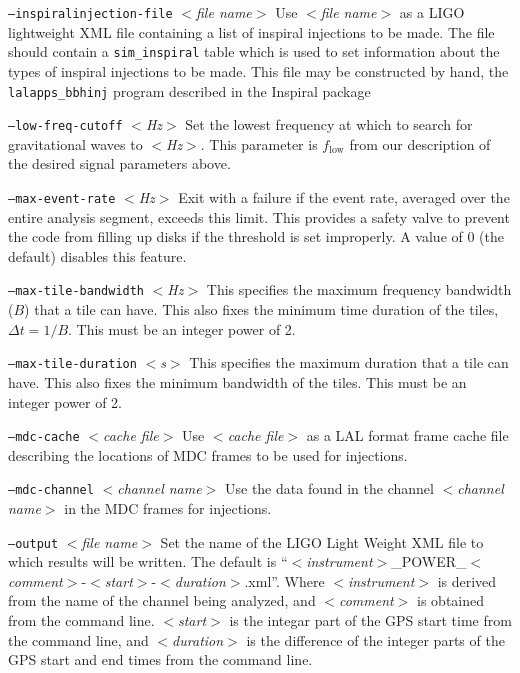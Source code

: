 \documentclass{article}
\newcommand{\option}[1]{\texttt{#1}}
\newcommand{\parm}[1]{$<$\textit{#1}$>$}
\newenvironment{entry}%
  {\begin{list}{}{\renewcommand{\makelabel}[1]%
    {\parbox[b]{\labelwidth}{\makebox[0pt][l]{\textbf{##1}}\\}}%
    \setlength{\labelwidth}{1em}%
    \setlength{\labelsep}{1em}%
    \setlength{\leftmargin}{2em}%
    \setlength{\topsep}{\medskipamount}%
    \setlength{\itemsep}{\medskipamount}%
    \setlength{\parsep}{\medskipamount}%
    \setlength{\listparindent}{0pt}}}
  {\end{list}}
\begin{document}
\begin{entry}
\begin{entry}
\item[\option{--inspiralinjection-file} \parm{file name}]
Use \parm{file name} as a LIGO lightweight XML file containing a list of inspiral
injections to be made.   The file should contain a \verb+sim_inspiral+ table
which is used to set information about the types of inspiral injections to be made.
This file may be constructed by hand, the
\verb+lalapps_bbhinj+ program described in the Inspiral package   

\item[\option{--low-freq-cutoff} \parm{Hz}]
Set the lowest frequency at which to search for gravitational waves to
\parm{Hz}.  This parameter is $f_{\mathrm{low}}$ from our description of
the desired signal parameters above.

\item[\option{--max-event-rate} \parm{Hz}]
Exit with a failure if the event rate, averaged over the entire analysis
segment, exceeds this limit.  This provides a safety valve to prevent the
code from filling up disks if the threshold is set improperly.  A value of
0 (the default) disables this feature.

\item[\option{--max-tile-bandwidth} \parm{Hz}]
This specifies the maximum frequency bandwidth (\(B\)) that a tile can
have.  This also fixes the minimum time duration of the tiles, $\Delta t =
1/B $.  This must be an integer power of 2.

\item[\option{--max-tile-duration} \parm{s}]
This specifies the maximum duration that a tile can have.  This also fixes
the minimum bandwidth of the tiles.  This must be an integer power of 2.

\item[\option{--mdc-cache} \parm{cache file}]
Use \parm{cache file} as a LAL format frame cache file describing the
locations of MDC frames to be used for injections.

\item[\option{--mdc-channel} \parm{channel name}]
Use the data found in the channel \parm{channel name} in the MDC frames for
injections.

\item[\option{--output} \parm{file name}]
Set the name of the LIGO Light Weight XML file to which results will be
written.  The default is
``\parm{instrument}\_POWER\_\parm{comment}-\parm{start}-\parm{duration}.xml''.
Where \parm{instrument} is derived from the name of the channel being
analyzed, and \parm{comment} is obtained from the command line.
\parm{start} is the integar part of the GPS start time from the command
line, and \parm{duration} is the difference of the integer parts of the
GPS start and end times from the command line.


\end{entry}
\end{entry}
\end{document}
